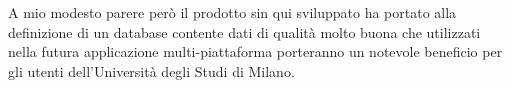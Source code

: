 \documentclass[12pt]{report}
\begin{document}
\vspace{5mm} %

A mio modesto parere però il prodotto sin qui sviluppato ha portato alla definizione di un database contente dati di qualità molto buona che utilizzati nella futura applicazione multi-piattaforma porteranno un notevole beneficio per gli utenti dell'Università degli Studi di Milano.   







%
%

%
%
\begin{thebibliography}{00}
%
\bibitem{}

%
\end{thebibliography}
% 
\end{document}
